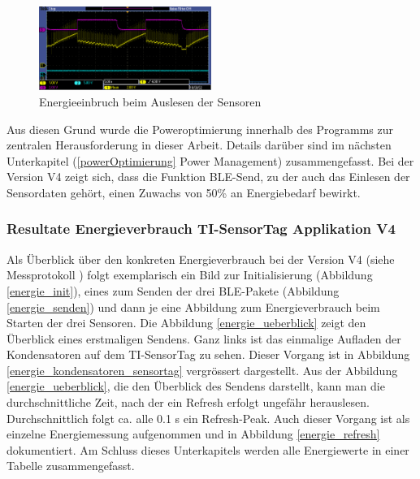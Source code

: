 \begin{figure}[ht]
    \includegraphics[width=0.5\textwidth]{3Vorgehen/imag/pic4VSUPbrichtEin.PNG} 
    \caption{Energieeinbruch beim Auslesen der Sensoren}
    \label{i2c_problem}
\end{figure}

\begin{minipage}{1\textwidth}
Aus diesen Grund wurde die Poweroptimierung innerhalb des Programms zur zentralen Herausforderung in dieser Arbeit. Details darüber sind im nächsten Unterkapitel (\ref{powerOptimierung} Power Management) zusammengefasst. Bei der Version V4 zeigt sich, dass die Funktion BLE-Send, zu der auch das Einlesen der Sensordaten gehört, einen Zuwachs von 50\thinspace\% an Energiebedarf bewirkt. 
\end{minipage}


\subsubsection{Resultate Energieverbrauch TI-SensorTag Applikation V4}
\label{energie_sensortag} 

Als Überblick über den konkreten Energieverbrauch bei der Version V4 (siehe Messprotokoll \cite{messung_energie_sensortag}) folgt exemplarisch ein Bild zur Initialisierung (Abbildung \ref{energie_init}), eines zum Senden der drei BLE-Pakete (Abbildung \ref{energie_senden}) und dann je eine Abbildung zum Energieverbrauch beim Starten der drei Sensoren. Die Abbildung \ref{energie_ueberblick} zeigt den Überblick eines erstmaligen Sendens. Ganz links ist das einmalige Aufladen der Kondensatoren auf dem TI-SensorTag zu sehen. Dieser Vorgang ist in Abbildung \ref{energie_kondensatoren_sensortag} vergrössert dargestellt. Aus der Abbildung \ref{energie_ueberblick}, die den Überblick des Sendens darstellt, kann man die durchschnittliche Zeit, nach der ein Refresh erfolgt ungefähr herauslesen. Durchschnittlich folgt ca. alle 0.1 s ein Refresh-Peak. Auch dieser Vorgang ist als einzelne Energiemessung aufgenommen und in Abbildung \ref{energie_refresh} dokumentiert. Am Schluss dieses Unterkapitels werden alle Energiewerte in einer Tabelle zusammengefasst.

